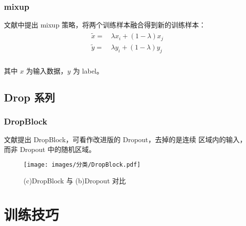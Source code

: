 \subsubsection{mixup}
文献中提出 mixup 策略，将两个训练样本融合得到新的训练样本：
\begin{align}
  \begin{split}
    \tilde{x} = & \, \lambda x_i + (1-\lambda) x_j  \\
    \tilde{y} = & \, \lambda y_i + (1-\lambda) y_j  \\
  \end{split}
\end{align}

其中 $x$ 为输入数据，$y$ 为 label。

\subsection{Drop 系列}
\subsubsection{DropBlock}
文献提出 DropBlock，可看作改进版的 Dropout，去掉的是连续
区域内的输入，而非 Dropout 中的随机区域。

\begin{figure}[ht]
  \centering
  \texttt{[image: images/分类/DropBlock.pdf]}
  \caption{(c)DropBlock 与 (b)Dropout 对比}
  \label{fig:dropblock}
\end{figure}

\section{训练技巧}


